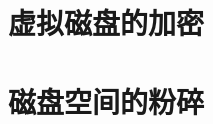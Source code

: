 \documentclass[../main.tex]{subfiles}
\begin{document}
\section{虚拟磁盘的加密}

\section{磁盘空间的粉碎}

\end{document}

